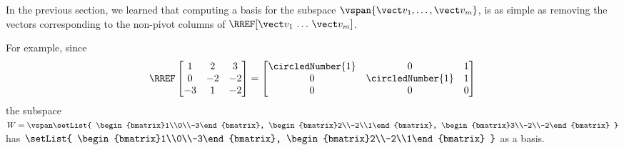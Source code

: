 


\begin{applicationActivities}

\begin{observation}
  In the previous section, we learned that
  computing a basis for the subspace \(\vspan\{\vect v_1,\dots,\vect v_m\}\),
  is as simple as removing the vectors corresponding to the non-pivot columns of
  \(\RREF[\vect v_1\,\dots\,\vect v_m]\).

  \vspace{1em}

  For example, since
  \[
    \RREF
    \begin{bmatrix}
      1 & 2 & 3 \\
      0 & -2 & -2 \\
      -3 & 1 & -2
    \end{bmatrix}
      =
    \begin{bmatrix}
      \circledNumber{1} & 0 & 1 \\
      0 & \circledNumber{1} & 1 \\
      0 & 0 & 0
    \end{bmatrix}
  \]
  the subspace
  \(
    W=\vspan\setList{
      \begin{bmatrix}1\\0\\-3\end{bmatrix},
      \begin{bmatrix}2\\-2\\1\end{bmatrix},
      \begin{bmatrix}3\\-2\\-2\end{bmatrix}
    }
  \)
  has
  \(
    \setList{
      \begin{bmatrix}1\\0\\-3\end{bmatrix},
      \begin{bmatrix}2\\-2\\1\end{bmatrix}
    }
  \)
  as a basis.
\end{observation}


\end{applicationActivities}
